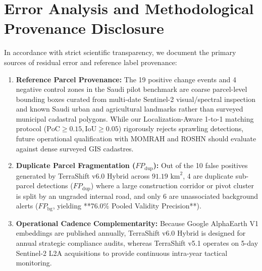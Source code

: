 \section{Error Analysis and Methodological Provenance Disclosure}
\label{sec:res_limitations}
In accordance with strict scientific transparency, we document the primary sources of residual error and reference label provenance:
\begin{enumerate}
    \item \textbf{Reference Parcel Provenance:} The 19 positive change events and 4 negative control zones in the Saudi pilot benchmark are coarse parcel-level bounding boxes curated from multi-date Sentinel-2 visual/spectral inspection and known Saudi urban and agricultural landmarks rather than surveyed municipal cadastral polygons. While our Localization-Aware 1-to-1 matching protocol ($\text{PoC} \ge 0.15, \text{IoU} \ge 0.05$) rigorously rejects sprawling detections, future operational qualification with MOMRAH and ROSHN should evaluate against dense surveyed GIS cadastres.
    \item \textbf{Duplicate Parcel Fragmentation ($FP_{\text{dup}}$):} Out of the 10 false positives generated by TerraShift v6.0 Hybrid across $91.19\text{ km}^2$, 4 are duplicate sub-parcel detections ($FP_{\text{dup}}$) where a large construction corridor or pivot cluster is split by an ungraded internal road, and only 6 are unassociated background alerts ($FP_{\text{bg}}$, yielding **76.0\% Pooled Validity Precision**).
    \item \textbf{Operational Cadence Complementarity:} Because Google AlphaEarth V1 embeddings are published annually, TerraShift v6.0 Hybrid is designed for annual strategic compliance audits, whereas TerraShift v5.1 operates on 5-day Sentinel-2 L2A acquisitions to provide continuous intra-year tactical monitoring.
\end{enumerate}
\newpage
